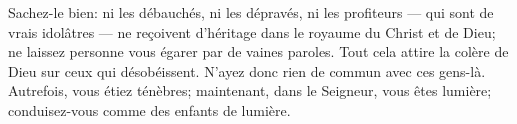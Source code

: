 Sachez-le bien: ni les débauchés, ni les dépravés, ni les profiteurs
		--- qui sont de vrais idolâtres ---
	ne reçoivent d’héritage dans le royaume du Christ et de Dieu;
	ne laissez personne vous égarer par de vaines paroles.
Tout cela attire la colère de Dieu sur ceux qui désobéissent.
	N’ayez donc rien de commun avec ces gens-là.
Autrefois, vous étiez ténèbres; maintenant, dans le Seigneur, vous êtes lumière;
	conduisez-vous comme des enfants de lumière.
